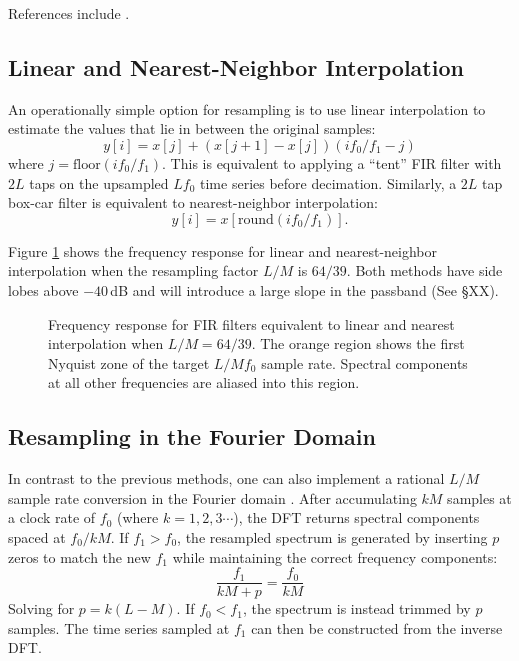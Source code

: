 \documentclass[11pt,preprint]{aastex}
\begin{document}
References include \citep{wang01}.

\subsection{Linear and Nearest-Neighbor Interpolation}
An operationally simple option for resampling is to use linear interpolation to estimate the values that lie in 
between the original samples:
\begin{equation}
y[i] = x[j] + (x[j+1] - x[j]) (if_0/f_1 - j)
\end{equation}
where $j = \mathrm{floor}(if_0/f_1)$.  This is equivalent to applying a ``tent'' FIR filter with $2L$ taps on the 
upsampled $Lf_0$ time series before decimation.  Similarly, a $2L$ tap box-car filter is equivalent to 
nearest-neighbor interpolation:
\begin{equation}
y[i] = x[\mathrm{round}(if_0/f_1)].
\end{equation}

Figure \ref{fig:windows} shows the frequency response for linear and nearest-neighbor interpolation when 
the resampling factor $L/M$ is $64/39$.  Both methods have side lobes above $-40$\,dB and will introduce a large 
slope in the passband (See \S XX).

\begin{figure}[H]
\caption{Frequency response for FIR filters equivalent to linear and nearest interpolation when $L/M = 64/39$.
The orange region shows the first Nyquist zone of the target $L/Mf_0$ sample rate.  Spectral components at all 
other frequencies are aliased into this region.}
\label{fig:windows}
\end{figure}
 
\subsection{Resampling in the Fourier Domain}
In contrast to the previous methods, one can also implement a rational $L/M$ sample rate conversion in the 
Fourier domain \citep{gold69,yeh82}.  After accumulating $kM$ samples at a clock rate of $f_0$ 
(where $k=1,2,3\cdots$), the DFT 
returns spectral components spaced at $f_0/kM$.  If $f_1 > f_0$, the resampled spectrum is generated by inserting
$p$ zeros to match the new $f_1$ while maintaining the correct frequency components: 
\begin{equation}
\frac{f_1}{kM+p} = \frac{f_0}{kM}
\end{equation} 
Solving for $p = k(L - M)$.  If $f_0 < f_1$, the spectrum is instead trimmed by $p$ samples.  The time series
sampled at $f_1$ can then be constructed from the inverse DFT.  
\end{document}
